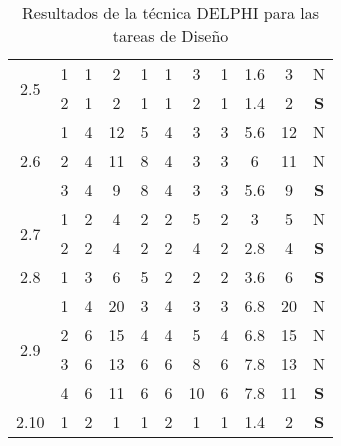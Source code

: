\documentclass[11pt,a4paper,spanish,twoside]{report}
\begin{document}
\begin{table}[!h]
\begin{tabular}{|c|c||c|c|c|c|c||c|c|c||c|}
    \multirow{2}{*}{2.5}& 1 & 1 & 2 & 1 & 1 & 3 & 1 & 1.6 & 3 & N \\
    & 2 & 1 & 2 & 1 & 1 & 2 & 1 & 1.4 & 2 & \textbf{S} \\
    \hline

    \multirow{3}{*}{2.6}& 1 & 4 & 12 & 5 & 4 & 3 & 3 & 5.6 & 12 & N \\
    & 2 & 4 & 11 & 8 & 4 & 3 & 3 & 6 & 11 & N \\
    & 3 & 4 & 9 & 8 & 4 & 3 & 3 & 5.6 & 9 & \textbf{S} \\
    \hline

    \multirow{2}{*}{2.7}& 1 & 2 & 4 & 2 & 2 & 5 & 2 & 3 & 5 & N \\
    & 2 & 2 & 4 & 2 & 2 & 4 & 2 & 2.8 & 4 & \textbf{S} \\
    \hline

    2.8 & 1 & 3 & 6 & 5 & 2 & 2 & 2 & 3.6 & 6 & \textbf{S} \\
    \hline

    \multirow{4}{*}{2.9}& 1 & 4 & 20 & 3 & 4 & 3 & 3 & 6.8 & 20 & N \\
    & 2 & 6 & 15 & 4 & 4 & 5 & 4 & 6.8 & 15 & N \\
    & 3 & 6 & 13 & 6 & 6 & 8 & 6 & 7.8 & 13 & N \\
    & 4 & 6 & 11 & 6 & 6 & 10 & 6 & 7.8 & 11 & \textbf{S} \\
    \hline

    2.10 & 1 & 2 & 1 & 1 & 2 & 1 & 1 & 1.4 & 2 & \textbf{S} \\
    \hline
  \end{tabular}
  \caption{Resultados de la técnica DELPHI para las tareas de
    Diseño} \label{Tab:dis}
\end{table}
\end{document}
